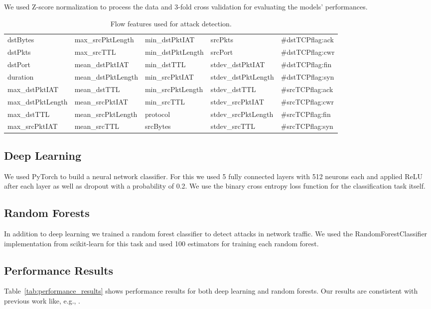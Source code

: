 \documentclass[sigconf,nonacm]{acmart}
\begin{document}
We used Z-score normalization to process the data and 3-fold cross validation for evaluating the models' performances.

\begin{table}
\renewcommand*{\arraystretch}{1.2} %
\caption{Flow features used for attack detection.}
\label{tab:features}
\begin{tabular}{l l l l l} \toprule
dstBytes	&	max\_srcPktLength	&	min\_dstPktIAT	&	srcPkts	&	\#dstTCPflag:ack	\\
dstPkts	&	max\_srcTTL	&	min\_dstPktLength	&	srcPort	&	\#dstTCPflag:cwr	\\
dstPort	&	mean\_dstPktIAT	&	min\_dstTTL	&	stdev\_dstPktIAT	&	\#dstTCPflag:fin	\\
duration	&	mean\_dstPktLength	&	min\_srcPktIAT	&	stdev\_dstPktLength	&	\#dstTCPflag:syn	\\
max\_dstPktIAT	&	mean\_dstTTL	&	min\_srcPktLength	&	stdev\_dstTTL	&	\#srcTCPflag:ack	\\
max\_dstPktLength	&	mean\_srcPktIAT	&	min\_srcTTL	&	stdev\_srcPktIAT	&	\#srcTCPflag:cwr	\\
max\_dstTTL	&	mean\_srcPktLength	&	protocol	&	stdev\_srcPktLength	&	\#srcTCPflag:fin	\\
max\_srcPktIAT	&	mean\_srcTTL	&	srcBytes	&	stdev\_srcTTL	&	\#srcTCPflag:syn	\\
 \bottomrule
\end{tabular}
\end{table}
 
\subsection{Deep Learning}
We used PyTorch to build a neural network classifier. For this we used 5 fully connected layers with 512 neurons each and applied ReLU after each layer as well as dropout with a probability of 0.2. We use the binary cross entropy loss function for the classification task itself. 

\subsection{Random Forests}
In addition to deep learning we trained a random forest classifier to detect attacks in network traffic. We used the RandomForestClassifier implementation from scikit-learn for this task and used 100 estimators for training each random forest.


\subsection{Performance Results}
Table~\ref{tab:performance_results} shows performance results for both deep learning and random forests. Our results are constistent with previous work like, e.g., \cite{fares}.
\end{document}
